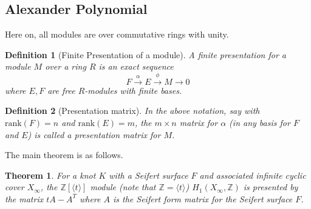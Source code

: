 \documentclass{article}[10pt]
\newtheorem{defn}{Definition}[subsection]
\newtheorem{theorem}{Theorem}[subsection]
\begin{document}
\subsection{Alexander Polynomial}
Here on, all modules are over commutative rings with unity.
\begin{defn}[Finite Presentation of a module]
A finite presentation for a module $M$ over a ring $R$ is an exact sequence $$F\xrightarrow{\alpha}E\xrightarrow{\phi}M\xrightarrow{}0$$ where $E,F$ are free $R$-modules with finite bases.
\end{defn}
\begin{defn}[Presentation matrix]
In the above notation, say with $\mathrm{rank}(F)=n$ and $\mathrm{rank}(E)=m$, the $m\times n$ matrix for $\alpha$ (in any basis for $F$ and $E$) is called a presentation matrix for $M$. 
\end{defn}
The main theorem is as follows.
\begin{theorem}
\label{Alexander_Module}
For a knot $K$ with a Seifert surface $F$ and associated infinite cyclic cover $X_{\infty}$, the $\mathbb{Z}[\langle t \rangle]$ module (note that $\mathbb{Z} =\langle t \rangle$) $H_{1}(X_{\infty},\mathbb{Z})$ is presented by the matrix $tA-A^{T}$ where $A$ is the Seifert form matrix for the Seifert surface $F$.
\end{theorem}
\end{document}

